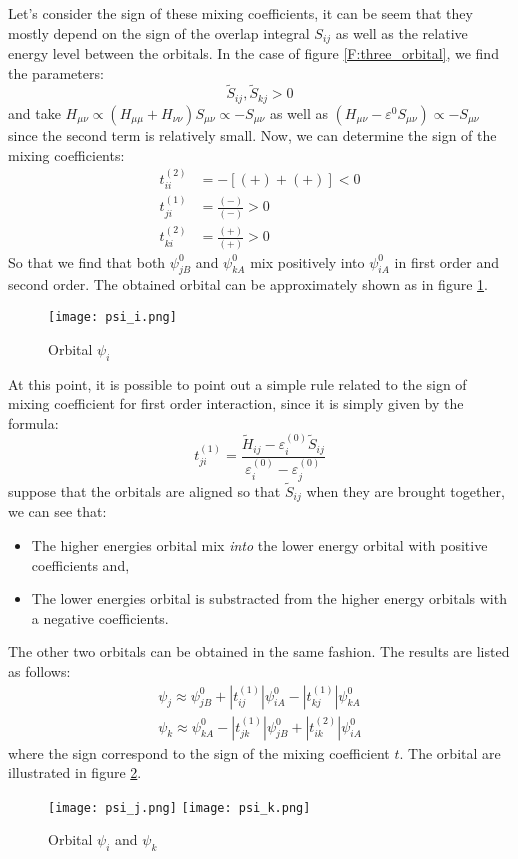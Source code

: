 \documentclass{article}
\newcommand{\order}[2]{#1^{(#2)}}
\begin{document}
Let's consider the sign of these mixing coefficients, it can be seem that they mostly depend on the sign of the overlap integral $S_{ij}$ as well as the relative 
energy level between the orbitals. In the case of figure \ref{F:three_orbital}, we find the parameters:
\begin{equation}
    \tilde{S}_{ij}, \tilde{S}_{kj} > 0 
\end{equation}
and take $H_{\mu\nu} \propto (H_{\mu\mu} + H_{\nu\nu}) S_{\mu\nu} \propto - S_{\mu\nu}$ as well as $(H_{\mu\nu} - \varepsilon^0 S_{\mu\nu}) \propto - S_{\mu\nu} $
since the second term is relatively small. Now, we can determine the sign of the mixing coefficients:
\begin{align}
    \order{t_{ii}}{2} &= - [ (+) + (+) ] < 0 \\ 
    \order{t_{ji}}{1} &= \frac{(-)}{(-)} > 0 \\
    \order{t_{ki}}{2} &= \frac{(+)}{(+)} > 0
\end{align}
So that we find that both $\psi_{jB}^0$ and $\psi_{kA}^0$ mix positively into $\psi_{iA}^0$ in first order and second order. The obtained orbital 
can be approximately shown as in figure \ref{F:psi_i}. 
\begin{figure}[h!]
    \centering
    \texttt{[image: psi\_i.png]}
    \caption{Orbital $\psi_{i}$}
    \label{F:psi_i}
\end{figure}

At this point, it is possible to point out a simple rule related to the sign of mixing coefficient 
for first order interaction, since it is simply given by the formula:
\[ t_{ji}^{(1)} = \frac{\tilde{H}_{ij}- \order{\varepsilon_i}{0} \tilde{S}_{ij}}{\order{\varepsilon_i}{0} - \order{\varepsilon_j}{0}}\] 
suppose that the orbitals are aligned so that $\tilde{S}_{ij}$ when they are brought together, we can 
see that:
\begin{itemize}
    \item The higher energies orbital mix \emph{into} the lower energy orbital with positive coefficients and,
    \item The lower energies orbital is substracted from the higher energy orbitals with a negative coefficients.
\end{itemize}

The other two orbitals can be obtained in the same fashion. The results are listed as follows:
\begin{align}
    \psi_{j} \approx \psi_{jB}^0 + |\order{t_{ij}}{1}| \psi_{iA}^0 - |\order{t_{kj}}{1}| \psi_{kA}^0 \\ 
    \psi_k \approx \psi_{kA}^0 - |\order{t_{jk}}{1}| \psi_{jB}^0 + |\order{t_{ik}}{2}| \psi_{iA}^0
\end{align}
where the sign correspond to the sign of the mixing coefficient $t$. The orbital are illustrated in figure \ref{F:psi_jk}.
\begin{figure}[h!]
    \centering
    \texttt{[image: psi\_j.png]}
    \texttt{[image: psi\_k.png]}
    \caption{Orbital $\psi_{i}$ and $\psi_{k}$}
    \label{F:psi_jk}
\end{figure}
\end{document}
